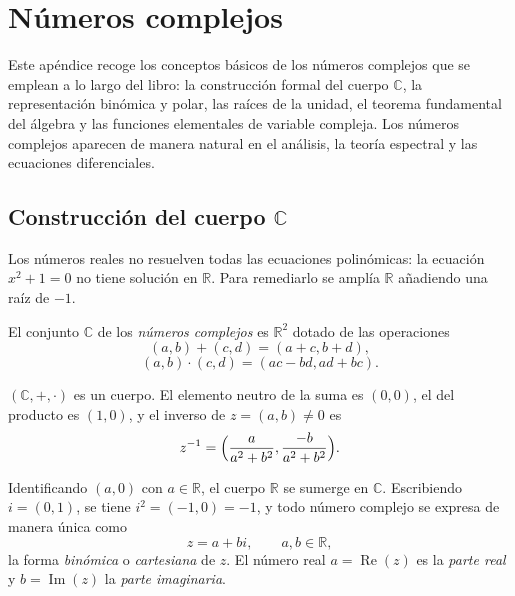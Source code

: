 \chapter{Números complejos}
\label{ap:numeros-complejos}

Este apéndice recoge los conceptos básicos de los números complejos que se emplean a lo largo del libro: la construcción formal del cuerpo $\mathbb{C}$, la representación binómica y polar, las raíces de la unidad, el teorema fundamental del álgebra y las funciones elementales de variable compleja. Los números complejos aparecen de manera natural en el análisis, la teoría espectral y las ecuaciones diferenciales.

\section{Construcción del cuerpo \texorpdfstring{$\mathbb{C}$}{C}}

Los números reales no resuelven todas las ecuaciones polinómicas: la ecuación $x^2+1=0$ no tiene solución en $\mathbb{R}$. Para remediarlo se amplía $\mathbb{R}$ añadiendo una raíz de $-1$.

\begin{definition}
\label{def:complejo}
El conjunto $\mathbb{C}$ de los \emph{números complejos} es $\mathbb{R}^2$ dotado de las operaciones
\begin{equation}\label{eq:suma-compleja}
  (a,b)+(c,d)=(a+c,b+d),
\end{equation}
\begin{equation}\label{eq:producto-complejo}
  (a,b)\cdot(c,d)=(ac-bd,ad+bc).
\end{equation}
\end{definition}

\begin{theorem}
\label{teo:c-cuerpo}
$(\mathbb{C},+,\cdot)$ es un cuerpo. El elemento neutro de la suma es $(0,0)$, el del producto es $(1,0)$, y el inverso de $z=(a,b)\neq 0$ es
\[
  z^{-1}=\Bigl(\frac{a}{a^2+b^2},\frac{-b}{a^2+b^2}\Bigr).
\]
\end{theorem}

Identificando $(a,0)$ con $a\in\mathbb{R}$, el cuerpo $\mathbb{R}$ se sumerge en $\mathbb{C}$. Escribiendo $i=(0,1)$, se tiene $i^2=(-1,0)=-1$, y todo número complejo se expresa de manera única como
\[
  z=a+bi,\qquad a,b\in\mathbb{R},
\]
la forma \emph{binómica} o \emph{cartesiana} de $z$. El número real $a=\operatorname{Re}(z)$ es la \emph{parte real} y $b=\operatorname{Im}(z)$ la \emph{parte imaginaria}.

